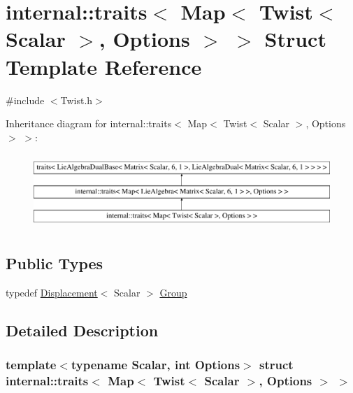 \hypertarget{structinternal_1_1traits_3_01_map_3_01_twist_3_01_scalar_01_4_00_01_options_01_4_01_4}{}\section{internal\+:\+:traits$<$ Map$<$ Twist$<$ Scalar $>$, Options $>$ $>$ Struct Template Reference}
\label{structinternal_1_1traits_3_01_map_3_01_twist_3_01_scalar_01_4_00_01_options_01_4_01_4}


{\ttfamily \#include $<$Twist.\+h$>$}

Inheritance diagram for internal\+:\+:traits$<$ Map$<$ Twist$<$ Scalar $>$, Options $>$ $>$\+:\begin{figure}[H]
\begin{center}
\leavevmode
\includegraphics[height=2.857143cm]{structinternal_1_1traits_3_01_map_3_01_twist_3_01_scalar_01_4_00_01_options_01_4_01_4}
\end{center}
\end{figure}
\subsection*{Public Types}
\begin{DoxyCompactItemize}
\item 
typedef \hyperlink{class_displacement}{Displacement}$<$ Scalar $>$ \hyperlink{structinternal_1_1traits_3_01_map_3_01_twist_3_01_scalar_01_4_00_01_options_01_4_01_4_a523550b7b4340ecfa108c8f8126ed636}{Group}
\end{DoxyCompactItemize}


\subsection{Detailed Description}
\subsubsection*{template$<$typename Scalar, int Options$>$\newline
struct internal\+::traits$<$ Map$<$ Twist$<$ Scalar $>$, Options $>$ $>$}



